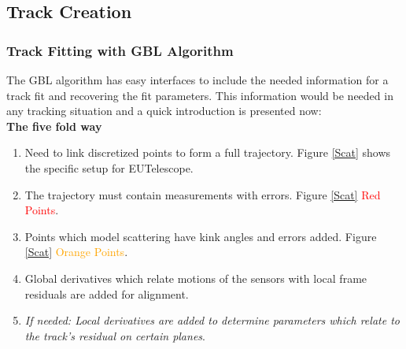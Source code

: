 \documentclass{beamer}
\begin{document}
\subsection{Track Creation}
\begin{frame}
\frametitle{Track Fitting with GBL Algorithm}
The GBL algorithm has easy interfaces to include the needed information for a track fit and recovering the fit parameters. This information would be needed in any tracking situation and a quick introduction is presented now: \\
\textbf{The five fold way}
\begin{enumerate}
\item \small{ Need to link discretized points to form a full trajectory. Figure \ref{Scat} shows the specific setup for EUTelescope.}
\item \small{The trajectory must contain measurements with errors. Figure \ref{Scat} \textcolor{red}{Red Points}.}
\item \small{ Points which model scattering have kink angles and errors added. Figure \ref{Scat} \textcolor{orange}{Orange Points}.}
\item \small{ Global derivatives which relate motions of the sensors with local frame residuals are added for alignment.}
\item \small{\textit{If needed: Local derivatives are added to determine parameters which relate to the track's residual on certain planes}.}
\end{enumerate}
\end{frame}
\end{document}
